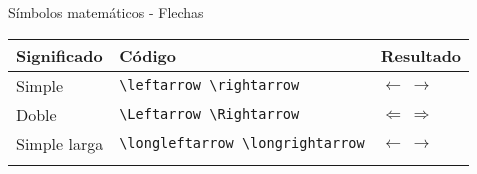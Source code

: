 \documentclass[
  ignorenonframetext,
]{beamer}
\begin{document}
\begin{frame}[fragile]{Símbolos matemáticos - Flechas}
\protect\hypertarget{suxedmbolos-matemuxe1ticos---flechas}{}

\begin{longtable}[]{@{}lll@{}}
\toprule
\begin{minipage}[b]{0.30\columnwidth}\raggedright
Significado\strut
\end{minipage} & \begin{minipage}[b]{0.30\columnwidth}\raggedright
Código\strut
\end{minipage} & \begin{minipage}[b]{0.30\columnwidth}\raggedright
Resultado\strut
\end{minipage}\tabularnewline
\midrule
\endhead
\begin{minipage}[t]{0.30\columnwidth}\raggedright
Simple\strut
\end{minipage} & \begin{minipage}[t]{0.30\columnwidth}\raggedright
\texttt{\textbackslash{}leftarrow\ \textbackslash{}rightarrow}\strut
\end{minipage} & \begin{minipage}[t]{0.30\columnwidth}\raggedright
\(\leftarrow\ \rightarrow\)\strut
\end{minipage}\tabularnewline
\begin{minipage}[t]{0.30\columnwidth}\raggedright
Doble\strut
\end{minipage} & \begin{minipage}[t]{0.30\columnwidth}\raggedright
\texttt{\textbackslash{}Leftarrow\ \textbackslash{}Rightarrow}\strut
\end{minipage} & \begin{minipage}[t]{0.30\columnwidth}\raggedright
\(\Leftarrow\ \Rightarrow\)\strut
\end{minipage}\tabularnewline
\begin{minipage}[t]{0.30\columnwidth}\raggedright
Simple larga\strut
\end{minipage} & \begin{minipage}[t]{0.30\columnwidth}\raggedright
\texttt{\textbackslash{}longleftarrow\ \textbackslash{}longrightarrow}\strut
\end{minipage} & \begin{minipage}[t]{0.30\columnwidth}\raggedright
\(\longleftarrow\  \longrightarrow\)\strut
\end{minipage}\tabularnewline
\begin{minipage}[t]{0.30\columnwidth}\raggedright

\end{minipage}
\end{longtable}
\end{frame}
\end{document}
